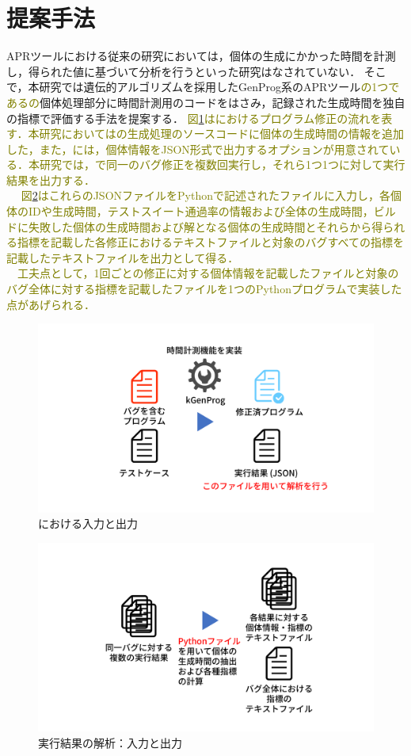 \documentclass[uplatex,dvipdfmx,a4paper]{jsarticle}
\newcommand{\modifiedTwo}[1]{{\textcolor{olive}{#1}}}
\let\oldcite\cite
\renewcommand{\cite}[1]{\xspace\oldcite{#1}}
\begin{document}
\section{提案手法} \label{sec:sgst}
APRツールにおける従来の研究においては，個体の生成にかかった時間を計測し，得られた値に基づいて分析を行うといった研究はなされていない．
そこで，本研究では遺伝的アルゴリズムを採用したGenProg\cite{le2011genprog}系のAPRツール\modifiedTwo{の1つである\kgp\cite{higo2018kgenprog}の}個体処理部分に時間計測用のコードをはさみ，記録された生成時間を独自の指標で評価する手法を提案する．
\modifiedTwo{図\ref{fig:sgst_apr}は\kgp におけるプログラム修正の流れを表す．本研究においては\kgp の生成処理のソースコードに個体の生成時間の情報を追加した，また，\kgp には，個体情報をJSON形式で出力するオプションが用意されている．本研究では，\kgp で同一のバグ修正を複数回実行し，それら1つ1つに対して実行結果を出力する．\\　
図\ref{fig:sgst_flow}はこれらのJSONファイルをPythonで記述されたファイルに入力し，各個体のIDや生成時間，テストスイート通過率の情報および全体の生成時間，ビルドに失敗した個体の生成時間および解となる個体の生成時間とそれらから得られる指標を記載した各修正におけるテキストファイルと対象のバグすべての指標を記載したテキストファイルを出力として得る．\\　工夫点として，1回ごとの修正に対する個体情報を記載したファイルと対象のバグ全体に対する指標を記載したファイルを1つのPythonプログラムで実装した点があげられる．}
\begin{figure}[t]
  \centering
  \includegraphics[width=\linewidth]{fig/sgst_apr.pdf}
  \caption{\kgp における入力と出力}
  \label{fig:sgst_apr}
\end{figure}
\begin{figure}[t]
  \centering
  \includegraphics[width=\linewidth]{fig/sgst_flow.pdf}
  \caption{実行結果の解析：入力と出力}
  \label{fig:sgst_flow}
\end{figure}
\end{document}
